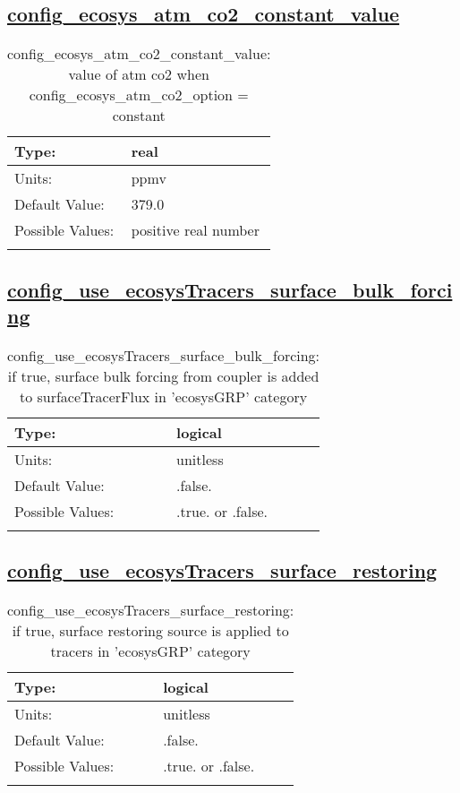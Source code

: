 \subsection[config\_ecosys\_atm\_co2\_constant\_value]{\hyperref[sec:nm_tab_tracer_forcing_ecosysTracers]{config\_ecosys\_atm\_co2\_constant\_value}}
\label{subsec:nm_sec_config_ecosys_atm_co2_constant_value}
\begin{center}
\begin{longtable}{| p{2.0in} || p{4.0in} |}
    \hline
    Type: & real \\
    \hline
    Units: & \si{ppmv} \\
    \hline
    Default Value: & 379.0 \\
    \hline
    Possible Values: & positive real number \\
    \hline
    \caption{config\_ecosys\_atm\_co2\_constant\_value: value of atm co2 when config\_ecosys\_atm\_co2\_option = constant}
\end{longtable}
\end{center}
\subsection[config\_use\_ecosysTracers\_surface\_bulk\_forcing]{\hyperref[sec:nm_tab_tracer_forcing_ecosysTracers]{config\_use\_ecosysTracers\_surface\_bulk\_forcing}}
\label{subsec:nm_sec_config_use_ecosysTracers_surface_bulk_forcing}
\begin{center}
\begin{longtable}{| p{2.0in} || p{4.0in} |}
    \hline
    Type: & logical \\
    \hline
    Units: & \si{unitless} \\
    \hline
    Default Value: & .false. \\
    \hline
    Possible Values: & .true. or .false. \\
    \hline
    \caption{config\_use\_ecosysTracers\_surface\_bulk\_forcing: if true, surface bulk forcing from coupler is added to surfaceTracerFlux in 'ecosysGRP' category}
\end{longtable}
\end{center}
\subsection[config\_use\_ecosysTracers\_surface\_restoring]{\hyperref[sec:nm_tab_tracer_forcing_ecosysTracers]{config\_use\_ecosysTracers\_surface\_restoring}}
\label{subsec:nm_sec_config_use_ecosysTracers_surface_restoring}
\begin{center}
\begin{longtable}{| p{2.0in} || p{4.0in} |}
    \hline
    Type: & logical \\
    \hline
    Units: & \si{unitless} \\
    \hline
    Default Value: & .false. \\
    \hline
    Possible Values: & .true. or .false. \\
    \hline
    \caption{config\_use\_ecosysTracers\_surface\_restoring: if true, surface restoring source is applied to tracers in 'ecosysGRP' category}
\end{longtable}
\end{center}
